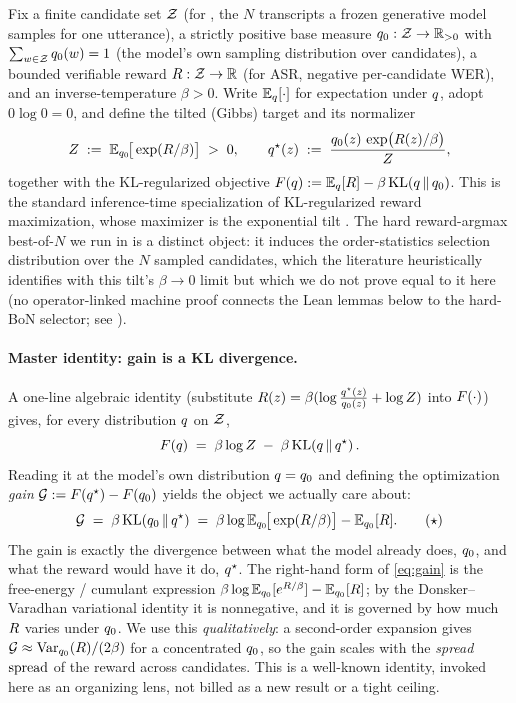 Fix a finite candidate set $\mathcal{Z}$ (for , the $N$ transcripts a frozen generative model
samples for one utterance), a strictly positive base measure $q_{0}:\mathcal{Z}\to\mathbb{R}_{>0}$ with
$\sum_{w\in\mathcal{Z}}q_{0}(w)=1$ (the model's own sampling distribution over candidates), a bounded verifiable
reward $R:\mathcal{Z}\to\mathbb{R}$ (for ASR, negative per-candidate WER), and an inverse-temperature $\beta>0$.
Write $\mathbb{E}_{q}[\cdot]$ for expectation under $q$, adopt $0\log0=0$, and define the tilted (Gibbs)
target and its normalizer
\[
Z \;:=\; \mathbb{E}_{q_{0}}\!\big[\exp(R/\beta)\big] \;>\;0,
\qquad
q^{\star}(z) \;:=\; \frac{q_{0}(z)\,\exp\!\big(R(z)/\beta\big)}{Z},
\]
together with the KL-regularized objective
$F\!\left(q\right) := \mathbb{E}_{q}[R] - \beta\,\mathrm{KL}\!\left(q \,\|\, q_{0}\right)$. This is the standard inference-time
specialization of KL-regularized reward maximization, whose maximizer is the exponential tilt
\citep{korbak2022kl,mudgal2024controlled}. The hard reward-argmax best-of-$N$ we run in 
is a distinct object: it induces the order-statistics selection distribution over the $N$ sampled
candidates, which the literature heuristically identifies with this tilt's $\beta\to0$ limit
\citep{beirami2024bon} but which we do not prove equal to it here (no operator-linked machine proof
connects the Lean lemmas below to the hard-BoN selector; see ).

\paragraph{Master identity: gain is a KL divergence.}
A one-line algebraic identity (substitute $R(z)=\beta(\log\tfrac{q^{\star}(z)}{q_{0}(z)}+\log Z)$ into
$F\!\left(\cdot\right)$) gives, for every distribution $q$ on $\mathcal{Z}$,
\[
F\!\left(q\right) \;=\; \beta\log Z \;-\; \beta\,\mathrm{KL}\!\left(q \,\|\, q^{\star}\right).
\]
Reading it at the model's own distribution $q=q_{0}$ and defining the optimization \emph{gain}
$\mathcal{G} := F\!\left(q^{\star}\right)-F\!\left(q_{0}\right)$ yields the object we actually care about:
\[
\mathcal{G} \;=\; \beta\,\mathrm{KL}\!\left(q_{0} \,\|\, q^{\star}\right)
\;=\; \beta\log\mathbb{E}_{q_{0}}\!\big[\exp(R/\beta)\big] - \mathbb{E}_{q_{0}}[R].
\tag{$\star$}\label{eq:gain}
\]
The gain is exactly the divergence between what the model already does, $q_{0}$, and what the reward
would have it do, $q^{\star}$. The right-hand form of \eqref{eq:gain} is the free-energy / cumulant
expression $\beta\log\mathbb{E}_{q_{0}}[e^{R/\beta}]-\mathbb{E}_{q_{0}}[R]$; by the Donsker--Varadhan variational
identity it is nonnegative, and it is governed by how much $R$ varies under $q_{0}$. We use this
\emph{qualitatively}: a second-order expansion gives $\mathcal{G} \approx \operatorname{Var}_{q_{0}}(R)/(2\beta)$
for a concentrated $q_{0}$, so the gain scales with the \emph{spread} $\mathrm{spread}$ of the reward across
candidates. This is a well-known identity, invoked here as an organizing lens, not billed as a new
result or a tight ceiling.


